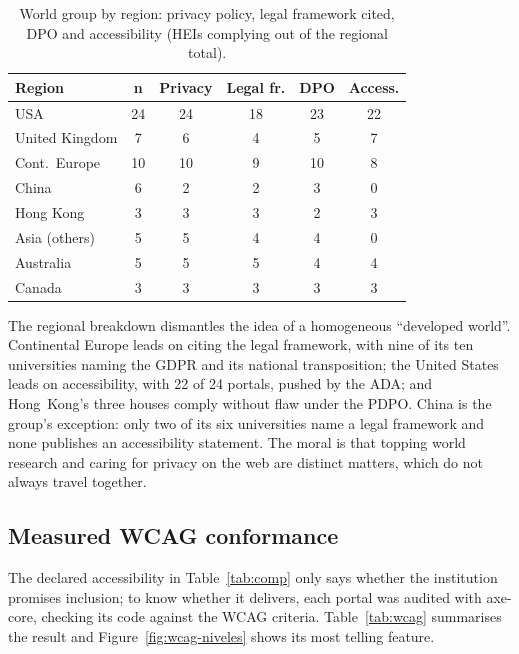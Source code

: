 \documentclass[pdflatex,sn-basic,Numbered]{sn-jnl}
\theoremstyle{thmstyleone}
\theoremstyle{thmstyletwo}
\theoremstyle{thmstylethree}
\begin{document}
\begin{table}[htbp]
	\centering
	\caption{World group by region: privacy policy, legal framework cited, DPO and accessibility (HEIs complying out of the regional total).}\label{tab:reg}
	\small
	\begin{tabular}{@{}lccccc@{}}
		\toprule
		\textbf{Region} & \textbf{n} & \textbf{Privacy} & \textbf{Legal fr.} & \textbf{DPO} & \textbf{Access.} \\
		\midrule
	USA & 24 & 24 & 18 & 23 & 22 \\
	United Kingdom & 7 & 6 & 4 & 5 & 7 \\
	Cont.\ Europe & 10 & 10 & 9 & 10 & 8 \\
	China & 6 & 2 & 2 & 3 & 0 \\
	Hong Kong & 3 & 3 & 3 & 2 & 3 \\
	Asia (others) & 5 & 5 & 4 & 4 & 0 \\
	Australia & 5 & 5 & 5 & 4 & 4 \\
	Canada & 3 & 3 & 3 & 3 & 3 \\
		\bottomrule
	\end{tabular}
\end{table}

The regional breakdown dismantles the idea of a homogeneous ``developed world''. Continental Europe leads on citing the legal framework, with nine of its ten universities naming the GDPR and its national transposition; the United States leads on accessibility, with 22 of 24 portals, pushed by the ADA; and Hong~Kong's three houses comply without flaw under the PDPO. China is the group's exception: only two of its six universities name a legal framework and none publishes an accessibility statement. The moral is that topping world research and caring for privacy on the web are distinct matters, which do not always travel together.

\subsection{Measured WCAG conformance}
The declared accessibility in Table~\ref{tab:comp} only says whether the institution promises inclusion; to know whether it delivers, each portal was audited with axe-core, checking its code against the WCAG criteria. Table~\ref{tab:wcag} summarises the result and Figure~\ref{fig:wcag-niveles} shows its most telling feature.
\end{document}
